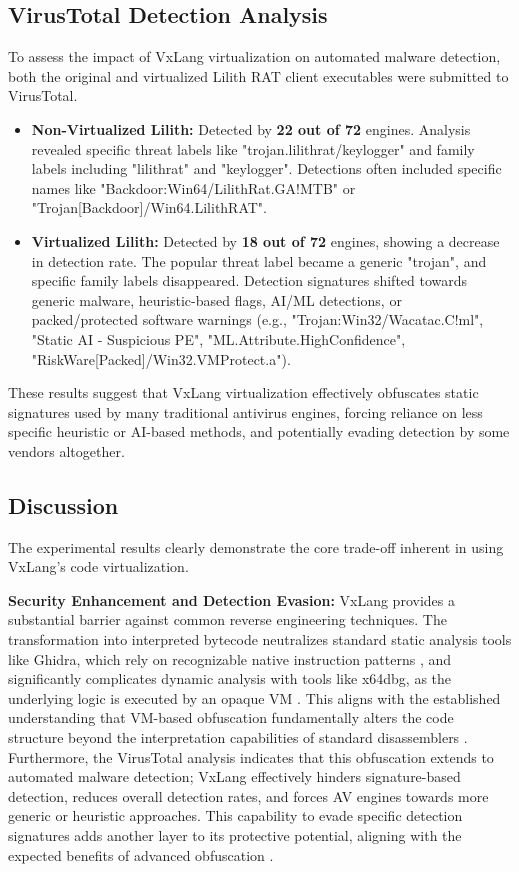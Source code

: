 \subsection{VirusTotal Detection Analysis}
To assess the impact of VxLang virtualization on automated malware detection, both the original and virtualized Lilith RAT client executables  were submitted to VirusTotal.

\begin{itemize}
	\item \textbf{Non-Virtualized Lilith:} Detected by \textbf{22 out of 72} engines. Analysis revealed specific threat labels like "trojan.lilithrat/keylogger" and family labels including "lilithrat" and "keylogger". Detections often included specific names like "Backdoor:Win64/LilithRat.GA!MTB" or "Trojan[Backdoor]/Win64.LilithRAT".
	\item \textbf{Virtualized Lilith:} Detected by \textbf{18 out of 72} engines, showing a decrease in detection rate. The popular threat label became a generic "trojan", and specific family labels disappeared. Detection signatures shifted towards generic malware, heuristic-based flags, AI/ML detections, or packed/protected software warnings (e.g., "Trojan:Win32/Wacatac.C!ml", "Static AI - Suspicious PE", "ML.Attribute.HighConfidence", "RiskWare[Packed]/Win32.VMProtect.a").
\end{itemize}
These results suggest that VxLang virtualization effectively obfuscates static signatures used by many traditional antivirus engines, forcing reliance on less specific heuristic or AI-based methods, and potentially evading detection by some vendors altogether.

\subsection{Discussion}
The experimental results clearly demonstrate the core trade-off inherent in using VxLang's code virtualization.

\textbf{Security Enhancement and Detection Evasion:} VxLang provides a substantial barrier against common reverse engineering techniques. The transformation into interpreted bytecode neutralizes standard static analysis tools like Ghidra, which rely on recognizable native instruction patterns \cite{Eilam2011, Ko2007}, and significantly complicates dynamic analysis with tools like x64dbg, as the underlying logic is executed by an opaque VM \cite{Sikorski2012}. This aligns with the established understanding that VM-based obfuscation fundamentally alters the code structure beyond the interpretation capabilities of standard disassemblers \cite{Ore06, Sal18}. Furthermore, the VirusTotal analysis indicates that this obfuscation extends to automated malware detection; VxLang effectively hinders signature-based detection, reduces overall detection rates, and forces AV engines towards more generic or heuristic approaches. This capability to evade specific detection signatures adds another layer to its protective potential, aligning with the expected benefits of advanced obfuscation \cite{Ore06, Sal18, Rou13}.


